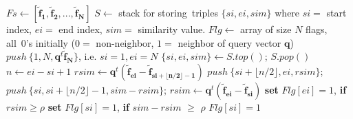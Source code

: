 \documentclass[sigconf, anonymous, review]{acmart}
\begin{document}
\begin{algorithm}
\caption{Iterative Binary Splitting}\label{alg:binsplt}
\begin{algorithmic}[1]
\State $Fs \gets [\boldsymbol{\widetilde{f}_1}, \boldsymbol{\widetilde{f}_2},...,\boldsymbol{\widetilde{f}_N}]$
\State $S \gets$ stack for storing\ triples $\{si, ei, sim\}$ where $si = $ start index, $ei = $ end index, $sim =$ similarity value.  
\State $Flg \gets$ array of size $N$ flags, all\ 0's initially ($0 =$ non-neighbor, $1 =$ neighbor of query vector $\boldsymbol{q}$)
\State $push\ \{1, N, \boldsymbol{q}^t\boldsymbol{\widetilde{f}_N}\}$, i.e. $si = 1, ei = N$
    \State $\{si, ei, sim\} \gets S.top()$; $S.pop()$
        \State $n \gets ei-si+1$
            \State $rsim \gets \boldsymbol{q}^t(\boldsymbol{\widetilde{f}_{ei}} - \boldsymbol{\widetilde{f}_{si+\lfloor n/2 \rfloor-1}})$ 
            \State $push\ \{si+\lfloor n/2 \rfloor, ei, rsim\}$; 
            \State $push\ \{si, si+\lfloor n/2 \rfloor-1,sim-rsim\}$; 
        \Else
                \State $rsim \gets \boldsymbol{q}^t(\boldsymbol{\widetilde{f}_{ei}} - \boldsymbol{\widetilde{f}_{si}})$
                \State \textbf{set} $Flg[ei] = 1$, \textbf{if} $rsim \geq \rho$
                \State \textbf{set} $Flg[si] = 1$, \textbf{if} $sim - rsim$ $\geq$ $\rho$
            \Else
                \State $Flg[si] = 1$ 
            \EndIf
        \EndIf
    \EndIf
\EndWhile
\end{algorithmic}
\end{algorithm}
\end{document}
